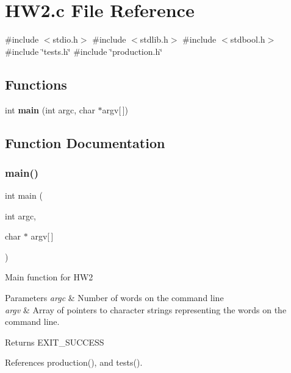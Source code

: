 \section{H\+W2.\+c File Reference}
\label{HW2_8c}
{\ttfamily \#include $<$stdio.\+h$>$}\newline
{\ttfamily \#include $<$stdlib.\+h$>$}\newline
{\ttfamily \#include $<$stdbool.\+h$>$}\newline
{\ttfamily \#include \char`\"{}tests.\+h\char`\"{}}\newline
{\ttfamily \#include \char`\"{}production.\+h\char`\"{}}\newline
\subsection*{Functions}
\begin{DoxyCompactItemize}
\item 
int \textbf{ main} (int argc, char $\ast$argv[$\,$])
\end{DoxyCompactItemize}


\subsection{Function Documentation}
\mbox{\label{HW2_8c_a0ddf1224851353fc92bfbff6f499fa97}} 
\subsubsection{main()}
{\footnotesize\ttfamily int main (\begin{DoxyParamCaption}\item[{int}]{argc,  }\item[{char $\ast$}]{argv[$\,$] }\end{DoxyParamCaption})}

Main function for H\+W2 
\begin{DoxyParams}{Parameters}
{\em argc} & Number of words on the command line \\
\hline
{\em argv} & Array of pointers to character strings representing the words on the command line. \\
\hline
\end{DoxyParams}
\begin{DoxyReturn}{Returns}
E\+X\+I\+T\+\_\+\+S\+U\+C\+C\+E\+SS 
\end{DoxyReturn}


References production(), and tests().

